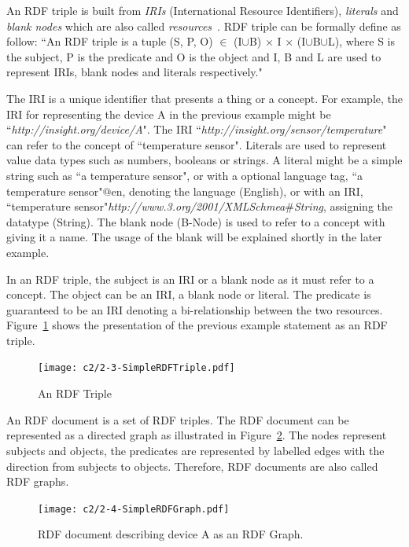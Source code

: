 {An RDF triple is built from \textit{IRIs} (International Resource Identifiers), \textit{literals} and \textit{blank nodes} which are also called \textit{resources}~\citep{Cyganiak:2014}. 
RDF triple can be formally define as follow:
``An RDF triple is a tuple (S, P, O) $\in$ (I$\cup$B)  $\times$ I $\times$ (I$\cup$B$\cup$L), where S is the subject, P is the predicate and O  is the object and I, B and L are used to represent IRIs, blank nodes and literals respectively."

The IRI is a unique identifier that presents a thing or a concept.
For example, the IRI for representing the device A in the previous example might be ``\textit{http://insight.org/device/A}". 
The IRI ``\textit{http://insight.org/sensor/temperature}" can refer to the concept of ``temperature sensor".
Literals are used to represent value data types such as numbers, booleans or strings. 
A literal might be a simple string such as ``a temperature sensor", or with a optional language tag, ``a temperature sensor"$@$en, 
denoting the language (English), or with an IRI, ``temperature sensor"{}\textit{http://www.3.org/2001/XMLSchmea$\#$String}, assigning the datatype (String). 
The blank node (B-Node) is used to refer to a concept with giving it a name. 
The usage of the blank will be explained shortly in the later example.

In an RDF triple, the subject is an IRI or a blank node as it must refer to a concept. 
The object can be an IRI, a blank node or literal. 
The predicate is guaranteed to be an IRI denoting a bi-relationship between the two resources. 
Figure~\ref{fig:2.3-SimpleRDFTriple} shows the presentation of the previous example statement as an RDF triple.

\begin{figure}[ht!]
	\centering
	\texttt{[image: c2/2-3-SimpleRDFTriple.pdf]}
	\caption{An RDF Triple }
	\label{fig:2.3-SimpleRDFTriple}
\end{figure}

An RDF document is a set of RDF triples.
The RDF document can be represented as a directed graph as illustrated in Figure~\ref{fig:2.4-SimpleRDFGraph}.
The nodes represent subjects and objects, the predicates are represented by labelled edges with the direction from subjects to objects. 
Therefore, RDF documents are also called RDF graphs.

\begin{figure}[ht!]
	\centering
	\texttt{[image: c2/2-4-SimpleRDFGraph.pdf]}
	\caption{RDF document describing device A as an RDF Graph.}
	\label{fig:2.4-SimpleRDFGraph}
\end{figure}

}
